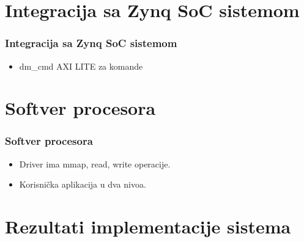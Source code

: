 \documentclass{beamer}
\begin{document}
\section{Integracija sa Zynq SoC sistemom}

\begin{frame}
  \frametitle<1-1>{Integracija sa Zynq SoC sistemom}

  \begin{itemize}
  \item<1-1> dm\_cmd AXI LITE za komande

  \end{itemize}

  \begin{figure}[H]
    \resizebox{0.7\textwidth}{!}{%
      
    }
  \end{figure}
\end{frame}

\section{Softver procesora}

\begin{frame}
  \frametitle<1-1>{Softver procesora}

  \begin{itemize}
  \item<1-1> Driver ima mmap, read, write operacije.
  \item<1-1> Korisnička aplikacija u dva nivoa.

  \end{itemize}

  \begin{figure}[H]
    \resizebox{0.7\textwidth}{!}{%
      
    }
  \end{figure}
\end{frame}

\section{Rezultati implementacije sistema}
\end{document}
